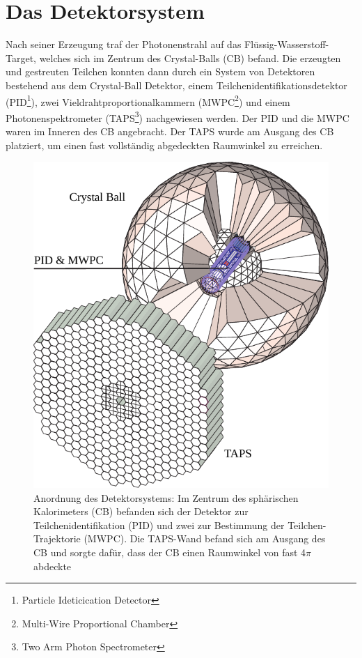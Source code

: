 \documentclass[a4paper,11pt,oneside,final,german,openbib,pdftex]{scrbook}
\begin{document}
{\section{Das Detektorsystem}
Nach seiner Erzeugung traf der Photonenstrahl auf das Flüssig-Wasserstoff-Target, welches sich im Zentrum des Crystal-Balls (CB) befand. Die erzeugten und gestreuten Teilchen konnten dann durch ein System von Detektoren bestehend aus dem Crystal-Ball Detektor, einem Teilchenidentifikationsdetektor (PID\footnote{Particle Ideticication Detector}), zwei Vieldrahtproportionalkammern (MWPC\footnote{Multi-Wire Proportional Chamber}) und einem Photonenspektrometer (TAPS\footnote{Two Arm  Photon Spectrometer}) nachgewiesen werden. Der PID und die MWPC waren im Inneren des CB angebracht. Der TAPS wurde am Ausgang des CB platziert, um einen fast vollständig abgedeckten Raumwinkel zu erreichen.
\begin{figure}[h]
	\begin{center}
		\includegraphics{crystal_ball}
	
		\caption{Anordnung des Detektorsystems: Im Zentrum des sph\"arischen Kalorimeters (CB) befanden sich der Detektor zur Teilchenidentifikation (PID) und zwei zur Bestimmung der Teilchen-Trajektorie (MWPC). Die TAPS-Wand befand sich am Ausgang des CB und sorgte daf\"ur, dass der CB einen Raumwinkel von fast 4$\pi$ abdeckte\cite{We13}}
		\label{[fig.crystal_ball]}	
\end{center}
\end{figure}

}
\end{document}
